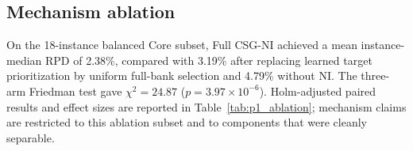 \subsection{Mechanism ablation} On the 18-instance balanced Core subset, Full CSG-NI achieved a mean instance-median RPD of 2.38\%, compared with 3.19\% after replacing learned target prioritization by uniform full-bank selection and 4.79\% without NI. The three-arm Friedman test gave $\chi^2=24.87$ ($p=3.97\times 10^{-6}$). Holm-adjusted paired results and effect sizes are reported in Table~\ref{tab:p1_ablation}; mechanism claims are restricted to this ablation subset and to components that were cleanly separable.
